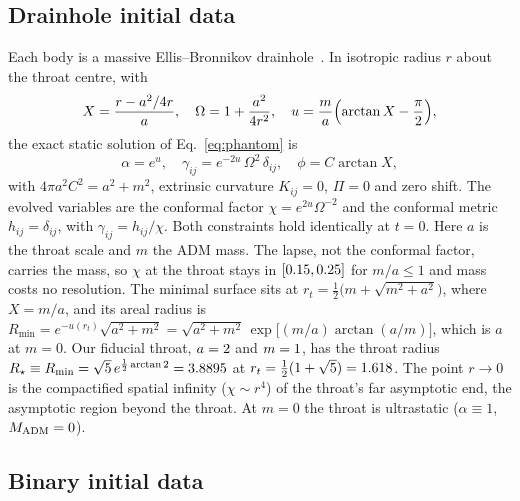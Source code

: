 \documentclass[twocolumn,floatfix,aps,prd,superscriptaddress,nofootinbib]{revtex4-2}
\begin{document}
\subsection{Drainhole initial data}
\label{sec:model:drainhole}

Each body is a massive Ellis--Bronnikov drainhole~\cite{ellis1973,bronnikov1973}. In isotropic radius $r$ about the throat centre, with
\begin{equation}
X = \frac{r - a^2/4r}{a},\quad
\Omega = 1 + \frac{a^2}{4r^2},\quad
u = \frac{m}{a}\Bigl(\arctan X - \frac{\pi}{2}\Bigr),
\end{equation}
the exact static solution of Eq.~\eqref{eq:phantom} is
\begin{equation}
\alpha = e^{u},\quad
\gamma_{ij} = e^{-2u}\,\Omega^2\,\delta_{ij},\quad
\phi = C\arctan X,
\label{eq:drainhole}
\end{equation}
with $4\pi a^2C^2 = a^2+m^2$, extrinsic curvature $K_{ij}=0$, $\Pi=0$ and zero shift. The evolved variables are the conformal factor $\chi = e^{2u}\Omega^{-2}$ and the conformal metric $h_{ij}=\delta_{ij}$, with $\gamma_{ij}=h_{ij}/\chi$. Both constraints hold identically at $t=0$. Here $a$ is the throat scale and $m$ the ADM mass. The lapse, not the conformal factor, carries the mass, so $\chi$ at the throat stays in $[0.15,0.25]$ for $m/a\le1$ and mass costs no resolution. The minimal surface sits at $r_t=\tfrac12\bigl(m+\sqrt{m^2+a^2}\bigr)$, where $X=m/a$, and its areal radius is $R_{\min}=e^{-u(r_t)}\sqrt{a^2+m^2}=\sqrt{a^2+m^2}\,\exp\!\bigl[(m/a)\arctan(a/m)\bigr]$, which is $a$ at $m=0$. Our fiducial throat, $a=2$ and $m=1$, has the throat radius $R_\star\equiv R_{\min}=\sqrt5\,e^{\frac12\arctan2}=3.8895$ at $r_t=\tfrac12(1+\sqrt5)=1.618$. The point $r\to0$ is the compactified spatial infinity ($\chi\sim r^4$) of the throat's far asymptotic end, the asymptotic region beyond the throat. At $m=0$ the throat is ultrastatic ($\alpha\equiv1$, $M_{\rm ADM}=0$).

\subsection{Binary initial data}
\label{sec:model:binary}
\end{document}
